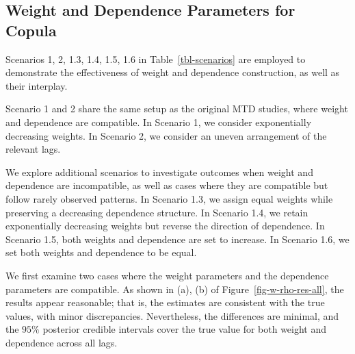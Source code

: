 \documentclass[
  letterpaper,
  double,
  12pt,
  1.0in]{beavtex}
\begin{document}
\begin{table}

\caption{\label{tbl-mar-table-s1}Estimates and Gelman-Rubin Diagnostics for Scenario 1's $\alpha$, $\beta$}


\end{table}%

\subsection{Weight and Dependence Parameters for
Copula}\label{sec-ch1-simu-res-w-rho}

Scenarios 1, 2, 1.3, 1.4, 1.5, 1.6 in Table~\ref{tbl-scenarios} are
employed to demonstrate the effectiveness of weight and dependence
construction, as well as their interplay.

Scenario 1 and 2 share the same setup as the original MTD studies, where
weight and dependence are compatible. In Scenario 1, we consider
exponentially decreasing weights. In Scenario 2, we consider an uneven
arrangement of the relevant lags.

We explore additional scenarios to investigate outcomes when weight and
dependence are incompatible, as well as cases where they are compatible
but follow rarely observed patterns. In Scenario 1.3, we assign equal
weights while preserving a decreasing dependence structure. In Scenario
1.4, we retain exponentially decreasing weights but reverse the
direction of dependence. In Scenario 1.5, both weights and dependence
are set to increase. In Scenario 1.6, we set both weights and dependence
to be equal.

We first examine two cases where the weight parameters and the
dependence parameters are compatible. As shown in (a), (b) of
Figure~\ref{fig-w-rho-res-all}, the results appear reasonable; that is,
the estimates are consistent with the true values, with minor
discrepancies. Nevertheless, the differences are minimal, and the
\(95\%\) posterior credible intervals cover the true value for both
weight and dependence across all lags.
\end{document}
